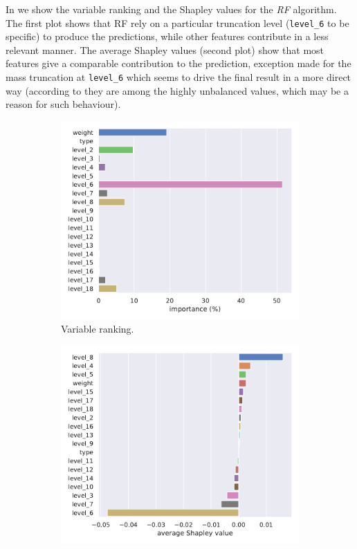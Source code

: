 In  we show the variable ranking and the Shapley values for the \emph{RF} algorithm.
The first plot shows that RF rely on a particular truncation level (\texttt{level\_6} to be specific) to produce the predictions, while other features contribute in a less relevant manner.
The average Shapley values (second plot) show that most features give a comparable contribution to the prediction, exception made for the mass truncation at \texttt{level\_6} which seems to drive the final result in a more direct way (according to  they are among the highly unbalanced values, which may be a reason for such behaviour).

\begin{figure}[htbp]
  \centering
  \begin{subfigure}{0.45\textwidth}
    \centering
    \includegraphics[width=\linewidth]{img/grd_bst_rank}
    \caption{Variable ranking.}
  \end{subfigure}
  \begin{subfigure}{0.45\textwidth}
    \centering
    \includegraphics[width=\linewidth]{img/grd_bst_shap}

\end{subfigure}
\end{figure}

